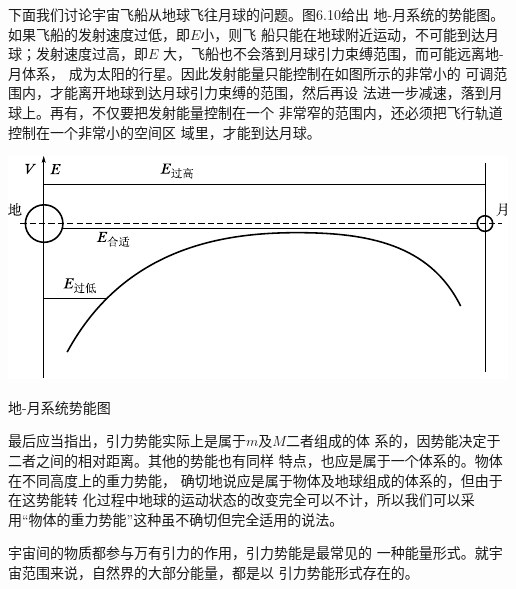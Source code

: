 下面我们讨论宇宙飞船从地球飞往月球的问题。图6.10给出
地-月系统的势能图。如果飞船的发射速度过低，即$ E $小，则飞
船只能在地球附近运动，不可能到达月球；发射速度过高，即$ E $
大，飞船也不会落到月球引力束缚范围，而可能远离地-月体系，
成为太阳的行星。因此发射能量只能控制在如图所示的非常小的
可调范围内，才能离开地球到达月球引力束缚的范围，然后再设
法进一步减速，落到月球上。再有，不仅要把发射能量控制在一个
非常窄的范围内，还必须把飞行轨道控制在一个非常小的空间区
域里，才能到达月球。

\begin{figurex}
  \centering
  \includegraphics{figure/fig06.10}
  \caption{地-月系统势能图}
  \label{fig:06.10}
\end{figurex}

最后应当指出，引力势能实际上是属于$ m $及$ M $二者组成的体
系的，因势能决定于二者之间的相对距离。其他的势能也有同样
特点，也应是属于一个体系的。物体在不同高度上的重力势能，
确切地说应是属于物体及地球组成的体系的，但由于在这势能转
化过程中地球的运动状态的改变完全可以不计，所以我们可以采
用“物体的重力势能”这种虽不确切但完全适用的说法。

宇宙间的物质都参与万有引力的作用，引力势能是最常见的
一种能量形式。就宇宙范围来说，自然界的大部分能量，都是以
引力势能形式存在的。